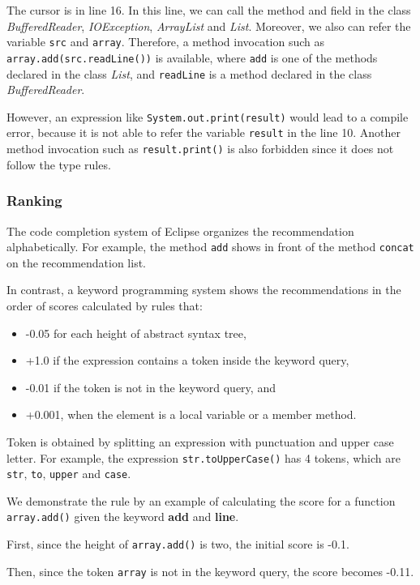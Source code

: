 \documentclass[PRO,english]{ipsj}
\begin{document}
The cursor is in line 16. In this line, we can call the method and field in the class \textit{BufferedReader}, \textit{IOException}, \textit{ArrayList} and \textit{List}. Moreover, we also can refer the variable \texttt{src} and \texttt{array}. Therefore, a method invocation such as \texttt{array.add(src.readLine())} is available, where \texttt{add} is one of the methods declared in the class \textit{List}, and \texttt{readLine} is a method declared in the class \textit{BufferedReader}. 

However, an expression like \texttt{System.out.print(result)} would lead to a compile error, because it is not able to refer the variable \texttt{result} in the line 10. Another method invocation such as \texttt{result.print()} is also forbidden since it does not follow the type rules.


\subsubsection{Ranking}
\label{subsubsection:Ranking}
The code completion system of Eclipse organizes the recommendation alphabetically. For example, the method \texttt{add} shows in front of the method \texttt{concat} on the recommendation list.

In contrast, a keyword programming system shows the recommendations in the order of scores calculated by rules that:
\begin{itemize}
\item -0.05 for each height of abstract syntax tree,
\item +1.0 if the expression contains a token inside the keyword query,
\item -0.01 if the token is not in the keyword query, and
\item +0.001, when the element is a local variable or a member method.
\end{itemize}

Token is obtained by splitting an expression with punctuation and upper case letter. For example, the expression \texttt{str.toUpperCase()} has 4 tokens, which are \texttt{str}, \texttt{to}, \texttt{upper} and \texttt{case}.

We demonstrate the rule by an example of calculating the score for a function \texttt{array.add()} given the keyword \textbf{add} and \textbf{line}.

First, since the height of \texttt{array.add()} is two, the initial score is -0.1.

Then, since the token \texttt{array} is not in the keyword query, the score becomes -0.11.
\end{document}
